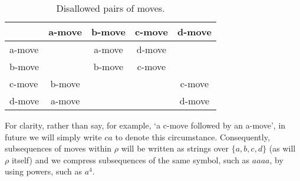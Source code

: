 \documentclass{article}
\begin{document}
\begin{table}[ht]
\caption{Disallowed pairs of moves.}
\centering
\begin{tabular}{|l | c | c | c | c|}
\hline
& a-move & b-move & c-move & d-move\\
\hline
a-move &  & a-move & d-move &  \\
b-move &  & b-move & c-move &  \\
c-move & b-move &  &  & c-move \\
d-move & a-move &  &  & d-move \\
\hline
\end{tabular}
\label{tablemoves}
\end{table}

For clarity, rather than say, for example, `a c-move followed by an a-move', in future we will simply write $ca$ to denote this circumstance. Consequently, subsequences of moves within $\rho$ will be written as strings over $\{a,b,c,d\}$ (as will $\rho$ itself) and we compress subsequences of the same symbol, such as $aaaa$, by using powers, such as $a^4$.
\end{document}
